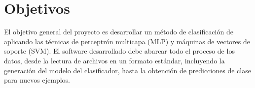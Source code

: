%
%
%
\section{Objetivos}
%
El objetivo general del proyecto es desarrollar un método de
clasificación de  aplicando las técnicas de
perceptrón multicapa (MLP) y máquinas de vectores de soporte (SVM).
El software desarrollado debe abarcar todo el proceso de los datos,
desde la lectura de archivos en un formato estándar, incluyendo la
generación del modelo del clasificador, hasta la obtención de 
predicciones de clase para nuevos ejemplos.

